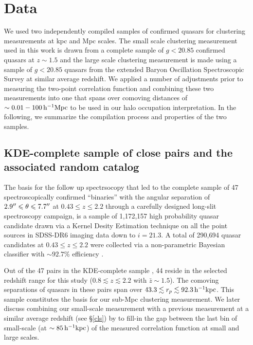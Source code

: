 \documentclass[useAMS,usenatbib]{mn2e}
\begin{document}
\section{Data}\label{dat}
 We used two independently compiled samples of confirmed quasars for clustering 
measurements at kpc and Mpc scales. The small scale clustering measurement used in this work is drawn from a complete sample of 
$g<20.85$ confirmed quasars at $z \sim 1.5$ and the large scale clustering measurement is 
made using a sample of $g<20.85$ quasars from the extended Baryon 
Oscillation Spectroscopic Survey \citep[eBOSS;][]{daw16} at similar average redshift. We applied a number of adjustments prior to measuring the two-point correlation function and combining these two measurements into one that spans over comoving distances of $\sim 0.01-100 \, \rm h^{-1}Mpc$ to be used in our halo occupation interpretation. In the following, we summarize the compilation process and properties of the two samples.

\subsection{KDE-complete sample of close pairs and the associated random catalog}\label{sdat}
The basis for the follow up spectrsocopy that led to the complete sample of 47 spectroscopically confirmed ``binaries'' with the angular separation of $2.9\arcsec \leq \theta \leq 7.7\arcsec$ at $0.43 \leq z \leq 2.2$ through a carefully designed long-slit spectroscopy campaign, is a sample of 1{,}172{,}157 high probability quasar candidate drawn via a Kernel Desity Estimation technique \citep[KDE;][]{ric04} on all the point sources in SDSS-DR6\citep[][]{admc08} imaging data down to $i=21.3$. A total of 290{,}694 quasar candidates at $0.43 \leq z \leq 2.2$ were collected via a non-parametric Bayesian classifier with $\sim 92.7\%$ efficiency \citep[see ][and references therein for detail]{ef17}. 

Out of the 47 pairs in the KDE-complete sample \citep[presented in Figure 4 and Table 5 of][]{ef17}, 44 reside in the selected redshift range for this study ($0.8 \lesssim z \lesssim 2.2$ with $\bar z\sim 1.5$). The comoving separations of quasars in these pairs span over $43.3 \lesssim r_p \lesssim 92.3 \, \rm h^{-1}kpc$. This sample constitutes the basis for our sub-Mpc clustering measurement. We later discuss combining our small-scale measurement with a previous measurement at a similar average redshift (see \S\ref{cls}) by \citet{ko12} to fill-in the gap between the last bin of small-scale (at $\sim 85 \, \rm h^{-1}kpc$) of the measured correlation function at small and large scales. 
\end{document}
